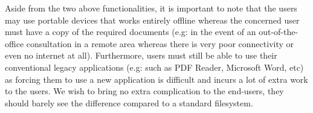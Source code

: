 \documentclass[../main.tex]{subfiles}
\begin{document}
\medbreak
\par Aside from the two above functionalities, it is important to note that the users may use portable devices that works entirely offline whereas the concerned user must have a copy of the required documents (e.g: in the event of an out-of-the-office consultation in a remote area whereas there is very poor connectivity or even no internet at all). Furthermore, users must still be able to use their conventional legacy applications (e.g: such as PDF Reader, Microsoft Word, etc) as forcing them to use a new application is difficult and incurs a lot of extra work to the users. We wish to bring no extra complication to the end-users, they should barely see the difference compared to a standard filesystem.
\end{document}
